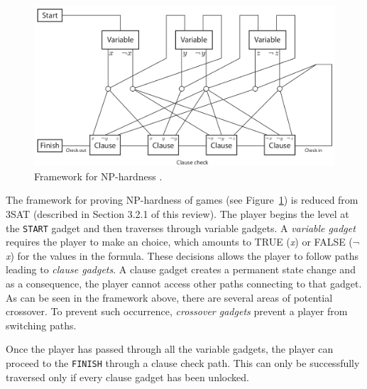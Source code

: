 \documentclass[11pt, a4paper, oneside]{report} %
\begin{document}
\begin{figure}[h!]

  \centering
    \includegraphics[scale=0.35]{aloupis_nphardness}
  \caption{Framework for NP-hardness \cite{Aloupis2012}.}
  \label{NP_hard}
\end{figure}

The framework for proving NP-hardness of games (see Figure~\ref{NP_hard}) is
reduced from 3SAT (described in Section 3.2.1 of this review). The player begins
the level at the \texttt{START} gadget and then traverses through variable
gadgets. A \textit{variable gadget} requires the player to make an choice, which
amounts to TRUE (\textit{x}) or FALSE (\( \neg \)\textit{x}) for the values in
the formula. These decisions allows the player to follow paths leading to
\textit{clause gadgets}. A clause gadget creates a permanent state change and as
a consequence, the player cannot access other paths connecting to that gadget.
As can be seen in the framework above, there are several areas of potential
crossover. To prevent such occurrence, \textit{crossover gadgets} prevent a
player from switching paths.

Once the player has passed through all the variable gadgets, the player can proceed to the
\texttt{FINISH} through a clause check path. This can only be successfully traversed only if every
clause gadget has been unlocked.



\end{document}

